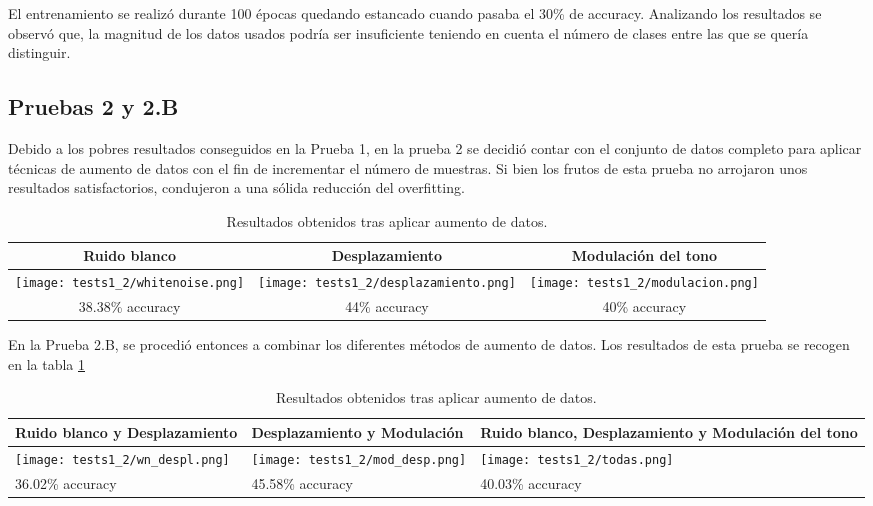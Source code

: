 \documentclass[11pt,a4paper,spanish]{book}
\begin{document}
	El entrenamiento se realizó durante 100 épocas quedando estancado cuando pasaba el 30\% de accuracy. Analizando los resultados se observó que, la magnitud de los datos usados podría ser insuficiente teniendo en cuenta el número de clases entre las que se quería distinguir.

	\subsection{Pruebas 2 y 2.B} %
	Debido a los pobres resultados conseguidos en la Prueba 1, en la prueba 2 se decidió contar con el conjunto de datos completo para aplicar técnicas de aumento de datos con el fin de incrementar el número de muestras. Si bien los frutos de esta prueba no arrojaron unos resultados satisfactorios, condujeron a una sólida reducción del overfitting.
	
	\begin{table}[H]
		\centering
		\begin{center}
			\begin{tabular}{| c | c | c |}
				\hline
				Ruido blanco & Desplazamiento & Modulación del tono \\ 
				\hline
				\texttt{[image: tests1\_2/whitenoise.png]} & \texttt{[image: tests1\_2/desplazamiento.png]} & \texttt{[image: tests1\_2/modulacion.png]}\\
				\hline
				38.38\% accuracy  & 44\%  accuracy & 40\% accuracy \\
				\hline	
			\end{tabular}
			\caption{Resultados obtenidos tras aplicar aumento de datos.}
		\end{center}
	\end{table}
	En la Prueba 2.B, se procedió entonces a combinar los diferentes métodos de aumento de datos. Los resultados de esta prueba se recogen en la tabla \ref{cap4:tabDA2}
	
	\begin{table}[H]
		\centering
		\begin{center}
			\begin{tabular}{|p{4.75cm} |p{4.75cm} |p{4.75cm}|}
				\hline
				Ruido blanco y Desplazamiento& Desplazamiento y Modulación & Ruido blanco, Desplazamiento y Modulación del tono \\ 
				\hline
				\texttt{[image: tests1\_2/wn\_despl.png]} & \texttt{[image: tests1\_2/mod\_desp.png]} & \texttt{[image: tests1\_2/todas.png]}\\
				\hline
				36.02\% accuracy & 45.58\%  accuracy & 40.03\% accuracy \\
				\hline	
			\end{tabular}
			\caption{Resultados obtenidos tras aplicar aumento de datos.}
			\label{cap4:tabDA2}
		\end{center}
	\end{table}
\end{document}
